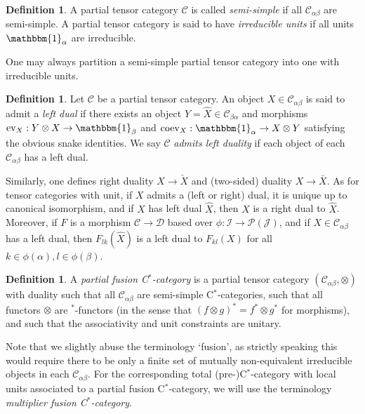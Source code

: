 \documentclass[10pt]{article}
\newcommand{\CatC}{\mathcal{C}}
\newcommand{\CatCC}{\mathscr{C}}
\newcommand{\CatDD}{\mathscr{D}}
\newcommand{\ev}{\mathrm{ev}}
\newcommand{\coev}{\mathrm{coev}}
\newcommand{\Unitb}{\mathbbm{1}}
\theoremstyle{definition}
\newtheorem{Def}[Theorem]{Definition}
\numberwithin{equation}{section}
\begin{document}
\begin{Def} A partial tensor category $\CatCC$ is called \emph{semi-simple} if all $\CatC_{\alpha\beta}$ are semi-simple. A partial tensor category is said to have \emph{irreducible units} if all units $\Unitb_\alpha$ are irreducible. 
\end{Def}

One may always partition a semi-simple partial  tensor category into one with irreducible units.

\begin{Def} Let $\CatCC$ be a partial tensor category. An object $X\in \CatC_{\alpha\beta}$ is said to admit a \emph{left dual} if there exists an object $Y=\hat{X} \in \CatC_{\beta\alpha}$ and morphisms $\ev_{X}: Y\otimes X \rightarrow \Unitb_\beta$ and $\coev_X: \Unitb_\alpha\rightarrow X\otimes Y$ satisfying the obvious snake identities. We say $\CatCC$ \emph{admits left duality} if each object of each $\CatC_{\alpha\beta}$ has a left dual.
\end{Def}

Similarly, one defines right duality $X\rightarrow \check{X}$ and (two-sided) duality $X\rightarrow \bar{X}$. As for tensor categories with unit, if $X$ admits a (left or right) dual, it is unique up to canonical isomorphism, and if $X$ has left dual $\hat{X}$, then $X$ is a right dual to $\hat{X}$. Moreover, if $F$ is a morphism $\CatCC\rightarrow \CatDD$ based over $\phi:\mathscr{I}\rightarrow \mathscr{P}(\mathscr{J})$, and if $X\in \CatC_{\alpha\beta}$ has a left dual, then $F_{lk}(\hat{X})$ is a left dual to $F_{kl}(X)$ for all $k\in \phi(\alpha),l \in\phi(\beta)$.

\begin{Def}\label{DefParFus} A \emph{partial fusion C$^*$-category} is a partial tensor category $(\CatC_{\alpha\beta},\otimes)$ with duality such that all $\CatC_{\alpha\beta}$ are semi-simple C$^*$-categories, such that all functors $\otimes$ are $^*$-functors (in the sense that $(f\otimes g)^* = f^*\otimes g^*$ for morphisms), and such that the associativity and unit constraints are unitary.
\end{Def} 

Note that we slightly abuse the terminology `fusion', as strictly speaking this would require there to be only a finite set of mutually non-equivalent irreducible objects in each $\CatC_{\alpha\beta}$. For the corresponding total (pre-)C$^*$-category with local units associated to a partial fusion C$^*$-category, we will use the terminology \emph{multiplier fusion C$^*$-category}.
\end{document}
